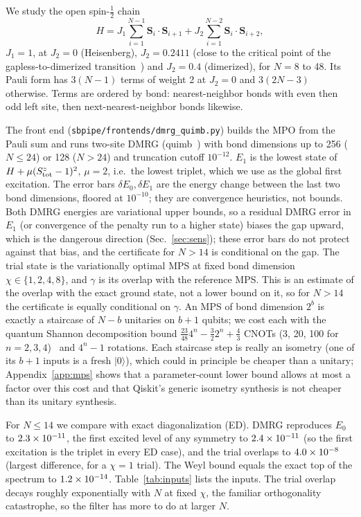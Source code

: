 \documentclass[aps,pra,twocolumn,superscriptaddress,nofootinbib]{revtex4-2}
\newcommand{\ket}[1]{|#1\rangle}
\begin{document}
We study the open spin-$\frac12$ chain
\begin{equation}
H=J_1\sum_{i=1}^{N-1}\mathbf S_i\cdot\mathbf S_{i+1}+J_2\sum_{i=1}^{N-2}\mathbf S_i\cdot\mathbf S_{i+2},
\end{equation}
$J_1=1$, at $J_2=0$ (Heisenberg), $J_2=0.2411$ (close to the critical point of the
gapless-to-dimerized transition~\cite{Okamoto1992,Eggert1996}) and $J_2=0.4$ (dimerized), for $N=8$ to
48. Its Pauli form has $3(N-1)$ terms of weight 2 at $J_2=0$ and $3(2N-3)$ otherwise. Terms are ordered by bond: nearest-neighbor bonds
with even then odd left site, then next-nearest-neighbor bonds likewise.

The front end (\texttt{sbpipe/frontends/dmrg\_quimb.py}) builds the MPO from the Pauli sum and runs
two-site DMRG (quimb~\cite{Gray2018}) with bond dimensions up to 256 ($N\le24$) or 128 ($N>24$) and
truncation cutoff $10^{-12}$. $E_1$ is the lowest state of $H+\mu(S^z_{\rm tot}-1)^2$, $\mu=2$, i.e.\
the lowest triplet, which we use as the global first excitation. The error bars $\delta E_0,\delta E_1$
are the energy change between the last two bond dimensions, floored at $10^{-10}$; they are
convergence heuristics, not bounds. Both DMRG energies are variational upper bounds, so a residual
DMRG error in $E_1$ (or convergence of the penalty run to a higher state) biases the gap upward, which
is the dangerous direction (Sec.~\ref{sec:sens}); these error bars do not protect against that bias, and
the certificate for $N>14$ is conditional on the gap. The trial state is
the variationally optimal MPS at fixed bond dimension $\chi\in\{1,2,4,8\}$, and $\gamma$ is its
overlap with the reference MPS. This is an estimate of the overlap with the exact ground state, not a
lower bound on it, so for $N>14$ the certificate is equally conditional on $\gamma$. An MPS of bond dimension $2^b$ is exactly a staircase of $N-b$ unitaries
on $b+1$ qubits; we cost each with the quantum Shannon decomposition bound
$\frac{23}{48}4^n-\frac32 2^n+\frac43$ CNOTs (3, 20, 100 for $n=2,3,4$)~\cite{Shende2006} and $4^n-1$
rotations. Each staircase step is really an isometry (one of its $b+1$ inputs is a fresh $\ket0$), which could in principle
be cheaper than a unitary; Appendix~\ref{app:mps} shows that a parameter-count lower bound allows at most a factor
\mpsMaxSaving{} over this cost and that Qiskit's generic isometry synthesis is not cheaper than its unitary synthesis.

For $N\le14$ we compare with exact diagonalization (ED). DMRG reproduces $E_0$ to $2.3\times10^{-11}$,
the first excited level of any symmetry to $2.4\times10^{-11}$ (so the first excitation is the triplet in
every ED case), and the trial overlaps to
$4.0\times10^{-8}$ (largest difference, for a $\chi=1$ trial). The Weyl bound equals the exact top of the spectrum to $1.2\times10^{-14}$.
Table~\ref{tab:inputs} lists the inputs. The trial overlap decays roughly exponentially with $N$ at
fixed $\chi$, the familiar orthogonality catastrophe, so the filter has more to do at larger $N$.
\end{document}
